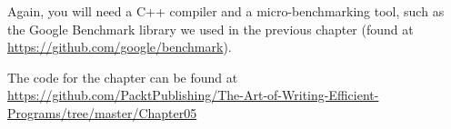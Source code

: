 Again, you will need a C++ compiler and a micro-benchmarking tool, such as the Google Benchmark library we used in the previous chapter (found at \url{https://github.com/google/benchmark}).

The code for the chapter can be found at \url{https://github.com/PacktPublishing/The-Art-of-Writing-Efficient-Programs/tree/master/Chapter05}